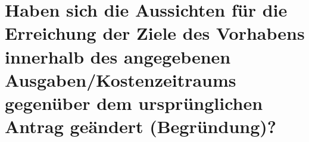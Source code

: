 
\section{Haben sich die Aussichten für die Erreichung der Ziele des Vorhabens innerhalb des angegebenen Ausgaben/Kostenzeitraums gegenüber dem ursprünglichen Antrag geändert (Begründung)?}


